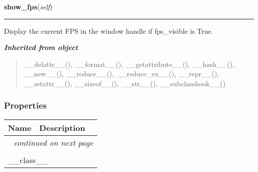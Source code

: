     \label{pygame-asteroids:game:GameController:show_fps}

    \vspace{0.5ex}

\hspace{.8\funcindent}\begin{boxedminipage}{\funcwidth}

    \raggedright \textbf{show\_fps}(\textit{self})

    \vspace{-1.5ex}

    \rule{\textwidth}{0.5\fboxrule}
\setlength{\parskip}{2ex}
    Display the current FPS in the window handle if fps\_visible is True.

\setlength{\parskip}{1ex}
    \end{boxedminipage}


\large{\textbf{\textit{Inherited from object}}}

\begin{quote}
\_\_delattr\_\_(), \_\_format\_\_(), \_\_getattribute\_\_(), \_\_hash\_\_(), \_\_new\_\_(), \_\_reduce\_\_(), \_\_reduce\_ex\_\_(), \_\_repr\_\_(), \_\_setattr\_\_(), \_\_sizeof\_\_(), \_\_str\_\_(), \_\_subclasshook\_\_()
\end{quote}


  \subsubsection{Properties}

    \vspace{-1cm}
\hspace{\varindent}\begin{longtable}{|p{\varnamewidth}|p{\vardescrwidth}|l}
\cline{1-2}
\cline{1-2} \centering \textbf{Name} & \centering \textbf{Description}& \\
\cline{1-2}
\endhead\cline{1-2}\multicolumn{3}{r}{\small\textit{continued on next page}}\\\endfoot\cline{1-2}
\endlastfoot\multicolumn{2}{|l|}{\textit{Inherited from object}}\\
\multicolumn{2}{|p{\varwidth}|}{\raggedright \_\_class\_\_}\\
\cline{1-2}
\end{longtable}


